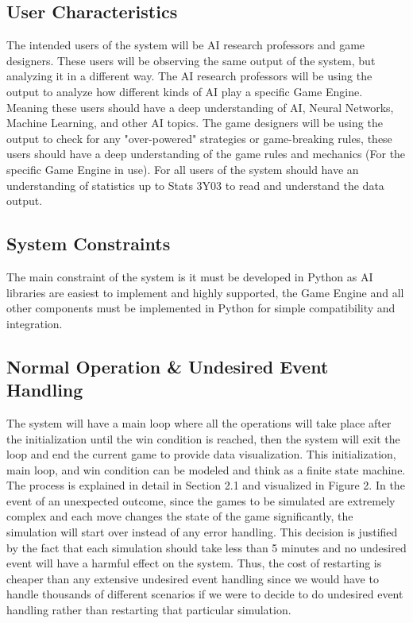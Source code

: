 \documentclass[12pt]{article}
\begin{document}
\subsection{User Characteristics} \label{SecUserCharacteristics}
The intended users of the system will be AI research professors and game designers. These users will be observing the same output of the system, but analyzing it in a different way. The AI research professors will be using the output to analyze how different kinds of AI play a specific Game Engine. Meaning these users should have a deep understanding of AI, Neural Networks, Machine Learning, and other AI topics. The game designers will be using the output to check for any "over-powered" strategies or game-breaking rules, these users should have a deep understanding of the game rules and mechanics (For the specific Game Engine in use). For all users of the system should have an understanding of statistics up to Stats 3Y03 to read and understand the data output.

\subsection{System Constraints}
The main constraint of the system is it must be developed in Python as AI libraries are easiest to implement and highly supported, the Game Engine and all other components must be implemented in Python for simple compatibility and integration.

\subsection{Normal Operation \& Undesired Event Handling}
The system will have a main loop where all the operations will take place after the initialization until the win condition is reached, then the system will exit the loop and end the current game to provide data visualization. This initialization, main loop, and win condition can be modeled and think as a finite state machine. The process is explained in detail in Section 2.1 and visualized in Figure 2. In the event of an unexpected outcome, since the games to be simulated are extremely complex and each move changes the state of the game significantly, the simulation will start over instead of any error handling. This decision is justified by the fact that each simulation should take less than 5 minutes and no undesired event will have a harmful effect on the system. Thus, the cost of restarting is cheaper than any extensive undesired event handling since we would have to handle thousands of different scenarios if we were to decide to do undesired event handling rather than restarting that particular simulation.
\end{document}
